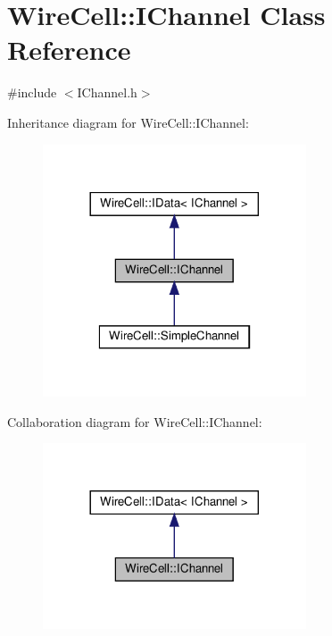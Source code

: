 \hypertarget{class_wire_cell_1_1_i_channel}{}\section{Wire\+Cell\+:\+:I\+Channel Class Reference}
\label{class_wire_cell_1_1_i_channel}


{\ttfamily \#include $<$I\+Channel.\+h$>$}



Inheritance diagram for Wire\+Cell\+:\+:I\+Channel\+:
\nopagebreak
\begin{figure}[H]
\begin{center}
\leavevmode
\includegraphics[width=221pt]{class_wire_cell_1_1_i_channel__inherit__graph}
\end{center}
\end{figure}


Collaboration diagram for Wire\+Cell\+:\+:I\+Channel\+:
\nopagebreak
\begin{figure}[H]
\begin{center}
\leavevmode
\includegraphics[width=221pt]{class_wire_cell_1_1_i_channel__coll__graph}
\end{center}
\end{figure}
